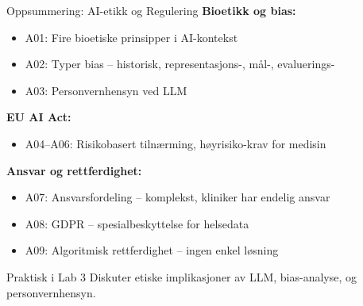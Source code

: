 \documentclass[aspectratio=169, 10pt]{beamer}
\begin{document}
\begin{frame}{Oppsummering: AI-etikk og Regulering}
    \textbf{Bioetikk og bias:}
    \begin{itemize}
        \item A01: Fire bioetiske prinsipper i AI-kontekst
        \item A02: Typer bias -- historisk, representasjons-, mål-, evaluerings-
        \item A03: Personvernhensyn ved LLM
    \end{itemize}
    
    \textbf{EU AI Act:}
    \begin{itemize}
        \item A04--A06: Risikobasert tilnærming, høyrisiko-krav for medisin
    \end{itemize}
    
    \textbf{Ansvar og rettferdighet:}
    \begin{itemize}
        \item A07: Ansvarsfordeling -- komplekst, kliniker har endelig ansvar
        \item A08: GDPR -- spesialbeskyttelse for helsedata
        \item A09: Algoritmisk rettferdighet -- ingen enkel løsning
    \end{itemize}
    
    \vspace{0.3cm}
    \begin{block}{Praktisk i Lab 3}
        Diskuter etiske implikasjoner av LLM, bias-analyse, og personvernhensyn.
    \end{block}
\end{frame}
\end{document}
